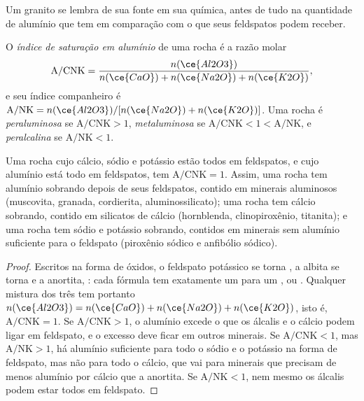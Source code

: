 Um granito se lembra de sua fonte em sua química, antes de tudo na quantidade de alumínio que
tem em comparação com o que seus feldspatos podem receber.

\begin{definition}\label{def:b2:crustal-melting:asi}
O \emph{índice de saturação em alumínio} de uma rocha é a
razão molar
\[\mathrm{A/CNK} = \frac{n(\ce{Al2O3})}{n(\ce{CaO}) + n(\ce{Na2O}) + n(\ce{K2O})},\]
e seu índice companheiro é $\mathrm{A/NK} = n(\ce{Al2O3})/[n(\ce{Na2O}) + n(\ce{K2O})]$. Uma rocha
é \emph{peraluminosa} se $\mathrm{A/CNK} > 1$,
\emph{metaluminosa} se $\mathrm{A/CNK} < 1 < \mathrm{A/NK}$, e
\emph{peralcalina} se $\mathrm{A/NK} < 1$.
\end{definition}

\begin{proposition}\label{prop:b2:crustal-melting:feldspar}
Uma rocha cujo cálcio, sódio e potássio estão todos em feldspatos, e cujo alumínio está
todo em feldspatos, tem $\mathrm{A/CNK} = 1$. Assim, uma rocha  tem alumínio
sobrando depois de seus feldspatos, contido em minerais aluminosos (muscovita, granada, cordierita,
aluminossilicato); uma rocha  tem cálcio sobrando, contido em silicatos de cálcio
(hornblenda, clinopiroxênio, titanita); e uma rocha  tem sódio e potássio
sobrando, contidos em minerais sem alumínio suficiente para o feldspato (piroxênio sódico e
anfibólio sódico).
\end{proposition}

\begin{proof}
Escritos na forma de óxidos, o feldspato potássico se torna , a albita se torna
 e a anortita, : cada fórmula tem exatamente um  para um
,  ou . Qualquer mistura dos três tem portanto $n(\ce{Al2O3}) =
n(\ce{CaO}) + n(\ce{Na2O}) + n(\ce{K2O})$, isto é, $\mathrm{A/CNK} = 1$. Se
$\mathrm{A/CNK} > 1$, o alumínio excede o que os álcalis e o cálcio podem ligar em
feldspato, e o excesso deve ficar em outros minerais. Se $\mathrm{A/CNK} < 1$, mas
$\mathrm{A/NK} > 1$, há alumínio suficiente para todo o sódio e o potássio na forma de
feldspato, mas não para todo o cálcio, que vai para minerais que precisam de menos alumínio
por cálcio que a anortita. Se $\mathrm{A/NK} < 1$, nem mesmo os álcalis podem estar todos em
feldspato.
\end{proof}

